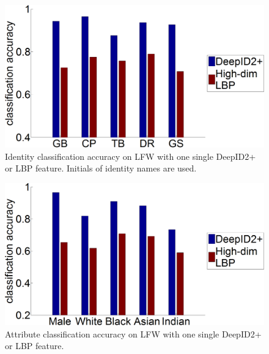 \documentclass[10pt,twocolumn,letterpaper]{article}
\begin{document}
\begin{figure}[t]
\begin{center}
\includegraphics[width=0.8\linewidth]{picture/05.png}
\end{center}
\vspace{-0.15in}
\caption{Identity classification accuracy on LFW with one single DeepID2+ or LBP feature. Initials of identity names are used.}
\label{fig:identity_sel}
\vspace{-0.1in}
\end{figure}

\begin{figure}[t]
\begin{center}
\includegraphics[width=0.8\linewidth]{picture/06.png}
\end{center}
\vspace{-0.15in}
\caption{Attribute classification accuracy on LFW with one single DeepID2+ or LBP feature.}
\label{fig:attribute_sel}
\vspace{-0.1in}
\end{figure}
\end{document}
